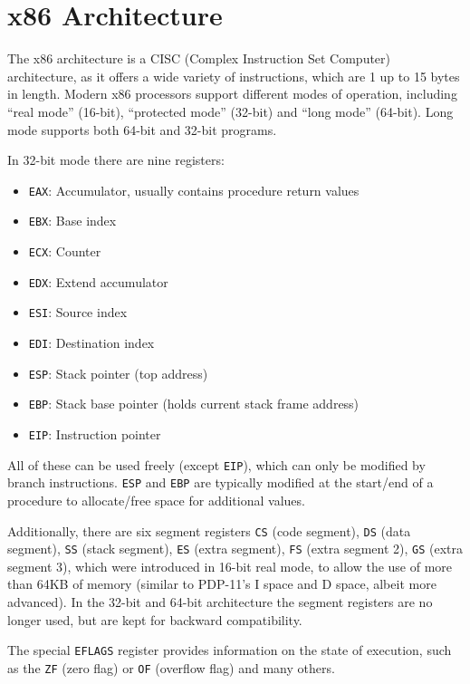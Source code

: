 \documentclass[draft,final]{vutinfth} %
\begin{document}
\section{x86 Architecture}
\label{x86arch}

The x86 architecture is a CISC (Complex Instruction Set Computer) architecture, as it offers a wide variety of instructions, which are 1 up to 15 bytes in length. Modern x86 processors support different modes of operation, including ``real mode'' (16-bit), ``protected mode'' (32-bit) and ``long mode'' (64-bit). Long mode supports both 64-bit and 32-bit programs.

In 32-bit mode there are nine registers:

\begin{itemize}
    \item \texttt{EAX}: Accumulator, usually contains procedure return values
    \item \texttt{EBX}: Base index
    \item \texttt{ECX}: Counter
    \item \texttt{EDX}: Extend accumulator
    \item \texttt{ESI}: Source index
    \item \texttt{EDI}: Destination index
    \item \texttt{ESP}: Stack pointer (top address)
    \item \texttt{EBP}: Stack base pointer (holds current stack frame address)
    \item \texttt{EIP}: Instruction pointer
\end{itemize}

All of these can be used freely (except \texttt{EIP}), which can only be modified by branch instructions. \texttt{ESP} and \texttt{EBP} are typically modified at the start/end of a procedure to allocate/free space for additional values.

Additionally, there are six segment registers \texttt{CS} (code segment), \texttt{DS} (data segment), \texttt{SS} (stack segment), \texttt{ES} (extra segment), \texttt{FS} (extra segment 2), \texttt{GS} (extra segment 3), which were introduced in 16-bit real mode, to allow the use of more than 64KB of memory (similar to PDP-11's I space and D space, albeit more advanced). In the 32-bit and 64-bit architecture the segment registers are no longer used, but are kept for backward compatibility.

The special \texttt{EFLAGS} register provides information on the state of execution, such as the \texttt{ZF} (zero flag) or \texttt{OF} (overflow flag) and many others.
\end{document}
